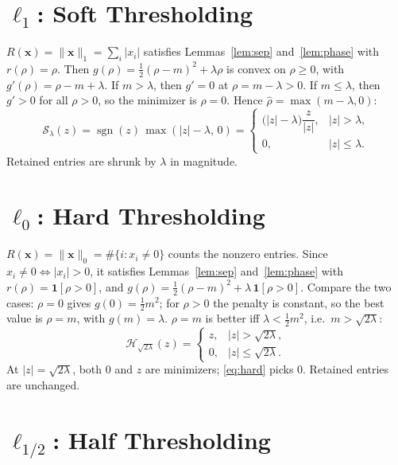 \documentclass[11pt,a4paper]{article}
\theoremstyle{definition}
\DeclareMathOperator{\sgn}{sgn}
\begin{document}
\section{$\ell_1$: Soft Thresholding}

$R(\mathbf x) = \lVert\mathbf x\rVert_1 = \sum_i |x_i|$ satisfies Lemmas~\ref{lem:sep} and~\ref{lem:phase} with $r(\rho) = \rho$.
Then $g(\rho) = \tfrac12(\rho-m)^2 + \lambda\rho$ is convex on $\rho\ge0$, with
$g'(\rho) = \rho - m + \lambda$.
If $m>\lambda$, then $g'=0$ at $\rho = m-\lambda>0$.
If $m\le\lambda$, then $g'>0$ for all $\rho>0$, so the minimizer is $\rho=0$.
Hence $\hat\rho = \max(m-\lambda,0)$:
\begin{equation}\label{eq:soft}
  \mathcal S_\lambda(z) = \sgn(z)\,\max(|z|-\lambda,\,0)
  = \begin{cases} \bigl(|z|-\lambda\bigr)\dfrac{z}{|z|}, & |z|>\lambda,\\[1ex] 0, & |z|\le\lambda.\end{cases}
\end{equation}
Retained entries are shrunk by $\lambda$ in magnitude.

\section{$\ell_0$: Hard Thresholding}

$R(\mathbf x) = \lVert\mathbf x\rVert_0 = \#\{i: x_i\neq 0\}$ counts the nonzero entries. Since
$x_i\neq0 \Leftrightarrow |x_i|>0$, it satisfies Lemmas~\ref{lem:sep} and~\ref{lem:phase} with $r(\rho) = \mathbf 1[\rho>0]$, and
$g(\rho) = \tfrac12(\rho-m)^2 + \lambda\,\mathbf 1[\rho>0]$. Compare the two cases:
$\rho=0$ gives $g(0) = \tfrac12 m^2$; for $\rho>0$ the penalty is constant, so the
best value is $\rho = m$, with $g(m) = \lambda$. $\rho=m$ is better iff
$\lambda<\tfrac12 m^2$, i.e.\ $m>\sqrt{2\lambda}$:
\begin{equation}\label{eq:hard}
  \mathcal H_{\sqrt{2\lambda}}(z) = \begin{cases} z, & |z|>\sqrt{2\lambda},\\ 0, & |z|\le\sqrt{2\lambda}.\end{cases}
\end{equation}
At $|z|=\sqrt{2\lambda}$, both $0$ and $z$ are minimizers; \eqref{eq:hard} picks $0$.
Retained entries are unchanged.

\section{$\ell_{1/2}$: Half Thresholding}
\end{document}

